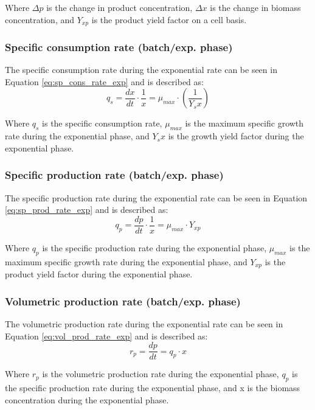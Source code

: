 Where $\Delta p$ is the change in product concentration, $\Delta x$ is the change in biomass concentration, and $Y_{xp}$ is the product yield factor on a cell basis.

\subsubsection*{Specific consumption rate (batch/exp. phase)}
The specific consumption rate during the exponential rate can be seen in Equation \ref*{eq:sp_cons_rate_exp} and is described as:
\begin{equation}
    q_s = \frac{dx}{dt} \cdot \frac{1}{x} = \mu_{max} \cdot (\frac{1}{Y_sx})
    \label{eq:sp_cons_rate_exp}
\end{equation}

Where $q_s$ is the specific consumption rate, $\mu_{max}$ is the maximum specific growth rate during the exponential phase, and $Y_sx$ is the growth yield factor during the exponential phase.

\subsubsection*{Specific production rate (batch/exp. phase)}    
The specific production rate during the exponential rate can be seen in Equation \ref*{eq:sp_prod_rate_exp} and is described as:
\begin{equation}
    q_p = \frac{dp}{dt} \cdot \frac{1}{x} = \mu_{max} \cdot Y_{xp}
    \label{eq:sp_prod_rate_exp}
\end{equation}

Where $q_p$ is the specific production rate during the exponential phase, $\mu_{max}$ is the maximum specific growth rate during the exponential phase, and $Y_{xp}$ is the product yield factor during the exponential phase.

\subsubsection*{Volumetric production rate (batch/exp. phase)}
The volumetric production rate during the exponential rate can be seen in Equation \ref*{eq:vol_prod_rate_exp} and is described as:
\begin{equation}
    r_p = \frac{dp}{dt} = q_p \cdot x
    \label{eq:vol_prod_rate_exp}
\end{equation}
    
Where $r_p$ is the volumetric production rate during the exponential phase, $q_p$ is the specific production rate during the exponential phase, and x is the biomass concentration during the exponential phase.

